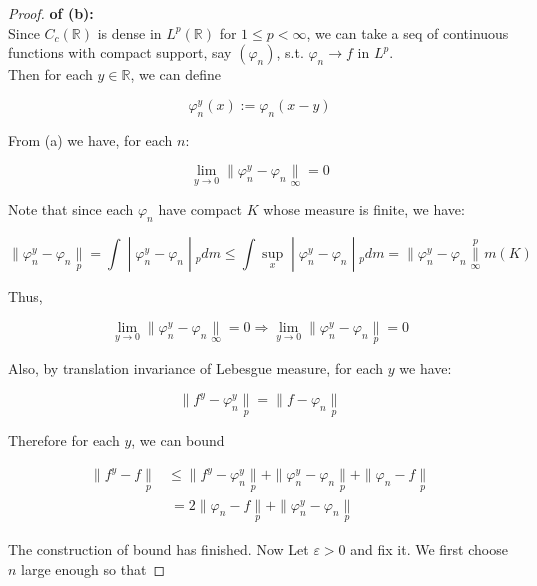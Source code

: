 \begin{proof}

\textbf{of (b):}\\
Since \(C_{c}(\mathbb{R})\) is dense in \(L^{p}(\mathbb{R})\) for \(1 \leq p < \infty\), we can take a seq of continuous functions with compact support, say \((\varphi_{n})\), s.t. \(\varphi_{n}\rightarrow f\) in \(L^{p}\).\\
Then for each \(y \in \mathbb{R}\), we can define

\[\varphi_{n}^{y}(x) := \varphi_{n}(x - y)\]

From (a) we have, for each \(n\):

\[\lim\limits_{y\rightarrow 0} \parallel \varphi_{n}^{y} - \varphi_{n}\underset{\infty}{\parallel} = 0\]

Note that since each \(\varphi_{n}\) have compact \(K\) whose measure is finite, we have:

\[\left. \parallel \varphi_{n}^{y} - \varphi_{n}\underset{p}{\parallel} = \int \middle| \varphi_{n}^{y} - \varphi_{n} \middle| {}_{p} dm \leq \int\sup\limits_{x} \middle| \varphi_{n}^{y} - \varphi_{n} \middle| {}_{p} dm = \parallel \varphi_{n}^{y} - \varphi_{n}\underset{\infty}{\overset{p}{\parallel}}m(K) \right.\]

Thus,

\[\lim\limits_{y\rightarrow 0} \parallel \varphi_{n}^{y} - \varphi_{n}\underset{\infty}{\parallel} = 0\Longrightarrow\lim\limits_{y\rightarrow 0} \parallel \varphi_{n}^{y} - \varphi_{n}\underset{p}{\parallel} = 0\]

Also, by translation invariance of Lebesgue measure, for each \(y\) we have:

\[\parallel f^{y} - \varphi_{n}^{y}\underset{p}{\parallel} = \parallel f - \varphi_{n}\underset{p}{\parallel}\]

Therefore for each \(y\), we can bound

\[\begin{matrix}
{\parallel f^{y} - f\underset{p}{\parallel}} & {\leq \parallel f^{y} - \varphi_{n}^{y}\underset{p}{\parallel} + \parallel \varphi_{n}^{y} - \varphi_{n}\underset{p}{\parallel} + \parallel \varphi_{n} - f\underset{p}{\parallel}} \\
 & {\  = 2 \parallel \varphi_{n} - f\underset{p}{\parallel} + \parallel \varphi_{n}^{y} - \varphi_{n}\underset{p}{\parallel}}
\end{matrix}\]

The construction of bound has finished. Now Let \(\varepsilon > 0\) and fix it. We first choose \(n\) large enough so that


\end{proof}

